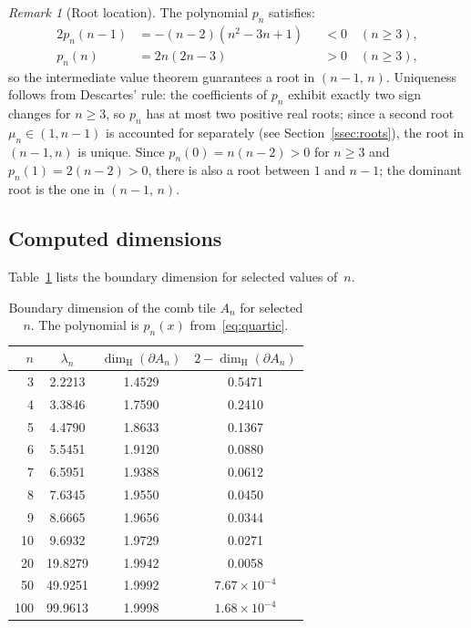 \documentclass{amsart}
\theoremstyle{definition}
\theoremstyle{remark}
\newtheorem{remark}[theorem]{Remark}
\newcommand{\dH}{\dim_{\mathrm{H}}}
\begin{document}
\begin{remark}[Root location]
The polynomial $p_n$ satisfies:
\begin{alignat*}{2}
  p_n(n{-}1) &= -(n{-}2)(n^2{-}3n{+}1) &&< 0 \quad (n \ge 3), \\
  p_n(n)     &= 2n(2n{-}3)              &&> 0 \quad (n \ge 3),
\end{alignat*}
so the intermediate value theorem guarantees a root in $(n{-}1,\,n)$.
Uniqueness follows from Descartes' rule: the coefficients of $p_n$ exhibit
exactly two sign changes for $n \ge 3$, so $p_n$ has at most two positive
real roots; since a second root $\mu_n \in (1,n{-}1)$ is accounted for
separately (see Section~\ref{ssec:roots}), the root in $(n{-}1,n)$ is unique.
Since $p_n(0) = n(n{-}2) > 0$ for $n \ge 3$ and $p_n(1) = 2(n{-}2) > 0$,
there is also a root between $1$ and $n{-}1$; the dominant root is the
one in $(n{-}1,\,n)$.
\end{remark}

\subsection{Computed dimensions}

Table~\ref{tab:dims} lists the boundary dimension for selected values
of~$n$.

\begin{table}[h]
\centering
\caption{Boundary dimension of the comb tile $A_n$ for selected $n$.
The polynomial is $p_n(x)$ from~\eqref{eq:quartic}.}
\label{tab:dims}
\begin{tabular}{rccc}
\toprule
$n$ & $\lambda_n$ & $\dH(\partial A_n)$ & $2 - \dH(\partial A_n)$ \\
\midrule
  3 & 2.2213 & 1.4529 & 0.5471 \\
  4 & 3.3846 & 1.7590 & 0.2410 \\
  5 & 4.4790 & 1.8633 & 0.1367 \\
  6 & 5.5451 & 1.9120 & 0.0880 \\
  7 & 6.5951 & 1.9388 & 0.0612 \\
  8 & 7.6345 & 1.9550 & 0.0450 \\
  9 & 8.6665 & 1.9656 & 0.0344 \\
 10 & 9.6932 & 1.9729 & 0.0271 \\
 20 & 19.8279 & 1.9942 & 0.0058 \\
 50 & 49.9251 & 1.9992 & $7.67 \times 10^{-4}$ \\
100 & 99.9613 & 1.9998 & $1.68 \times 10^{-4}$ \\
\bottomrule
\end{tabular}
\end{table}
\end{document}
